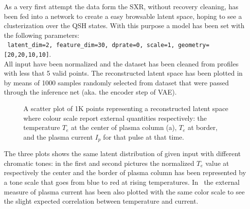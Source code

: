 As a very first attempt the data form the SXR, without recovery cleaning, has been fed into a  network to create a easy browsable latent space, hoping to see a clusterization over the QSH states.
With this purpose a  model has been set with the following parameters: \\
\verb| latent_dim=2, feature_dim=30, dprate=0, scale=1, geometry=[20,20,10,10]|. \\
All input have been normalized and the dataset has been cleaned from profiles with less that 5 valid points.
The reconstructed latent space has been plotted in~\Figure{\ref{fig:VAE2_qsh_ls}} by means of 1000 samples randomly selected from dataset that were passed through the inference net (aka. the encoder step of VAE).
\begin{figure}
    \centering
    \caption{A scatter plot of 1K points representing a reconstructed  latent space where colour scale report external quantities respectively: the temperature $T_e$ at the center of plasma column (a), $T_e$ at border, and the plasma current $I_p$ for that pulse at that time. }
    \label{fig:VAE2_qsh_ls}
\end{figure}
The three plots shows the same latent distribution of given input with different chromatic tones: in the first and second pictures the normalized $T_e$ value at respectively the center and the border of plasma column has been represented by a tone scale that goes from blue to red at rising temperatures. In~\Figure{\ref{fig:VAE2_qsh_ls_c}} the external measure of plasma current has been also plotted with the same color scale to see the slight expected correlation between temperature and current.

